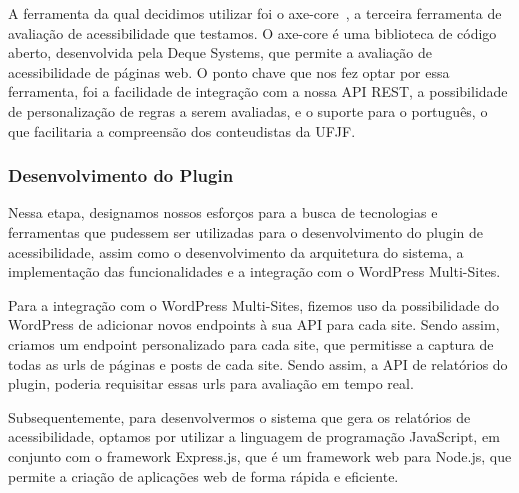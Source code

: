 \documentclass[12pt]{article}
\begin{document}
A ferramenta da qual decidimos utilizar foi o axe-core~\autocite{axecore}, a terceira
ferramenta de avaliação de acessibilidade que testamos. O axe-core é uma biblioteca
de código aberto, desenvolvida pela Deque Systems, que permite a avaliação de acessibilidade
de páginas web. O ponto chave que nos fez optar por essa ferramenta, foi a facilidade
de integração com a nossa API REST, a possibilidade de personalização de regras a serem
avaliadas, e o suporte para o português, o que facilitaria a compreensão dos conteudistas
da UFJF\@.

\subsubsection{Desenvolvimento do Plugin}
Nessa etapa, designamos nossos esforços para a busca de tecnologias e ferramentas
que pudessem ser utilizadas para o desenvolvimento do plugin de acessibilidade, assim
como o desenvolvimento da arquitetura do sistema, a implementação das funcionalidades
e a integração com o WordPress Multi-Sites.

Para a integração com o WordPress Multi-Sites, fizemos uso da possibilidade do WordPress
de adicionar novos endpoints à sua API para cada site. Sendo assim, criamos um endpoint
personalizado para cada site, que permitisse a captura de todas as urls de páginas e posts
de cada site. Sendo assim, a API de relatórios do plugin, poderia requisitar essas urls
para avaliação em tempo real.

Subsequentemente, para desenvolvermos o sistema que gera os relatórios de acessibilidade,
optamos por utilizar a linguagem de programação JavaScript, em conjunto com o framework 
Express.js, que é um framework web para Node.js, que permite a criação de aplicações web
de forma rápida e eficiente.

\nocite{*}
\printbibliography[title={Referências}]
\end{document}
